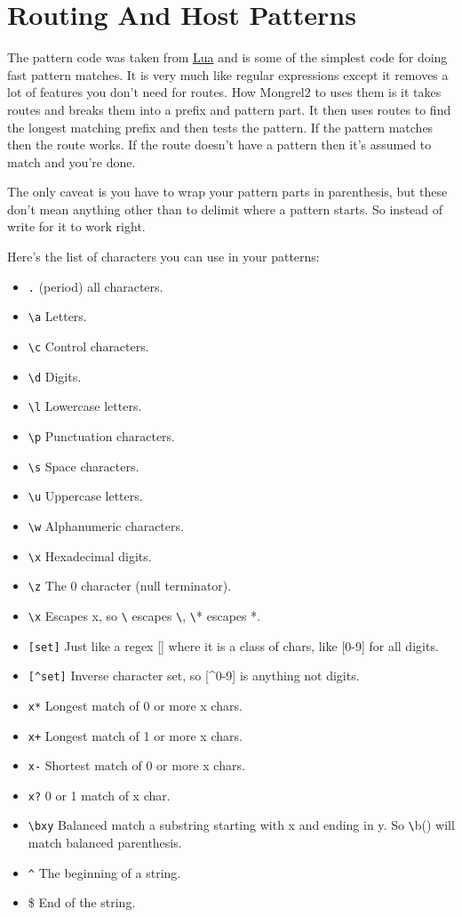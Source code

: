 \section{Routing And Host Patterns}

The pattern code was taken from \href{http://www.lua.org/}{Lua} and is some of the simplest 
code for doing fast pattern matches.  It is very much like regular expressions except it removes
a lot of features you don't need for routes.  How Mongrel2 to uses them is it takes routes and breaks
them into a prefix and pattern part.  It then uses routes to find the longest matching prefix and then
tests the pattern.  If the pattern matches then the route works.  If the route doesn't have a pattern
then it's assumed to match and you're done.

The only caveat is you have to wrap your pattern parts in parenthesis, but these don't mean anything
other than to delimit where a pattern starts.  So instead of  write 
for it to work right.

Here's the list of characters you can use in your patterns:

\begin{itemize}
\item \verb|.| (period) all characters.
\item \verb|\a| Letters.
\item \verb|\c| Control characters.
\item \verb|\d| Digits.
\item \verb|\l| Lowercase letters.
\item \verb|\p| Punctuation characters.
\item \verb|\s| Space characters.
\item \verb|\u| Uppercase letters.
\item \verb|\w| Alphanumeric characters.
\item \verb|\x| Hexadecimal digits.
\item \verb|\z| The 0 character (null terminator).
\item \verb|\x| Escapes x, so \verb|\| escapes \verb|\|, \verb|\|* escapes *.
\item \verb|[set]| Just like a regex [] where it is a class of chars, like [0-9] for all digits.
\item \verb|[^set]| Inverse character set, so [^0-9] is anything not digits.
\item \verb|x*| Longest match of 0 or more x chars.
\item \verb|x+| Longest match of 1 or more x chars.
\item \verb|x-| Shortest match of 0 or more x chars.
\item \verb|x?| 0 or 1 match of x char.
\item \verb|\bxy| Balanced match a substring starting with x and ending in y.  So \verb|\|b() will match balanced parenthesis.
\item \verb|^| The beginning of a string.
\item \$ End of the string.
\end{itemize}


